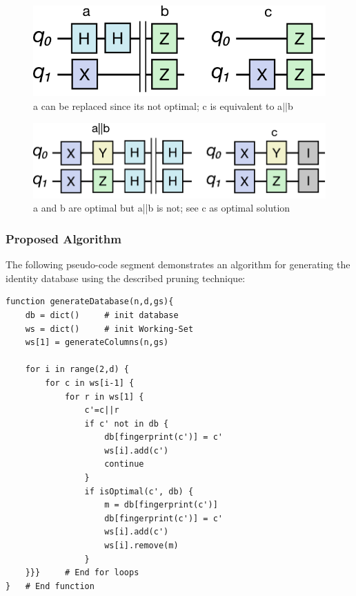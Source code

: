 \begin{figure}
	\includegraphics[width=0.8\columnwidth]{assets/approach.png}
	\caption{a can be replaced since its not optimal; c is equivalent to a$||$b}
	\label{fig:approach1}
\end{figure}

\begin{figure}
	\includegraphics[width=0.8\columnwidth]{assets/approach-2.png}
	\caption{a and b are optimal but a||b is not; see c as optimal solution}
	\label{fig:approach2}
\end{figure}

\subsubsection{Proposed Algorithm}

The following pseudo-code segment demonstrates an algorithm for generating the identity database using the described pruning technique:

\begin{verbatim}
function generateDatabase(n,d,gs){
	db = dict() 	# init database
	ws = dict() 	# init Working-Set
	ws[1] = generateColumns(n,gs)
	
	for i in range(2,d) {
		for c in ws[i-1] {
			for r in ws[1] {
				c'=c||r
				if c' not in db {
					db[fingerprint(c')] = c'
					ws[i].add(c')
					continue
				}
				if isOptimal(c', db) {
					m = db[fingerprint(c')]
					db[fingerprint(c')] = c'	
					ws[i].add(c')
					ws[i].remove(m)
				}
	}}} 	# End for loops
} 	# End function
\end{verbatim}


